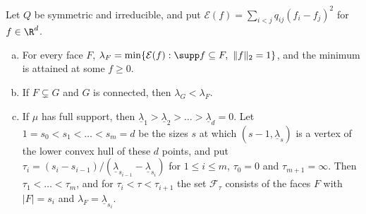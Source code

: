 \begin{lemma}\label{lem:symmetric}
Let $Q$ be symmetric and irreducible, and put
$\mathcal E(f)=\sum_{i<j}q_{ij}(f_i-f_j)^2$ for $f\in\R^d$.
\begin{enumerate}[(a)]
\item For every face $F$,
$\lambda_F=\min\{\mathcal E(f):\supp f\subseteq F,\ \lVert f\rVert_2=1\}$, and
the minimum is attained at some $f\ge0$.
\item If $F\subsetneq G$ and $G$ is connected, then $\lambda_G<\lambda_F$.
\item If $\mu$ has full support, then
$\underline\lambda_1>\underline\lambda_2>\dots>\underline\lambda_d=0$. Let
$1=s_0<s_1<\dots<s_m=d$ be the sizes $s$ at which $(s-1,\underline\lambda_s)$
is a vertex of the lower convex hull of these $d$ points, and put
$\tau_i=(s_i-s_{i-1})/(\underline\lambda_{s_{i-1}}-\underline\lambda_{s_i})$
for $1\le i\le m$, $\tau_0=0$ and $\tau_{m+1}=\infty$. Then $\tau_1<\dots<\tau_m$, and for
$\tau_i<\tau<\tau_{i+1}$ the set $\mathcal F_\tau$ consists of the faces $F$
with $\lvert F\rvert=s_i$ and $\lambda_F=\underline\lambda_{s_i}$.
\end{enumerate}
\end{lemma}

